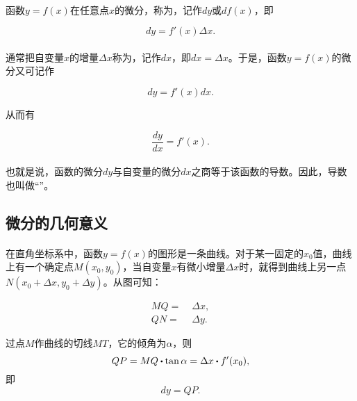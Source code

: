 \paragraph{}
函数$y=f(x)$在任意点$x$的微分，称为，记作$dy$或$df(x)$，即

\begin{equation}
  dy = f'(x)\Delta x.
\end{equation}

\paragraph{}
通常把自变量$x$的增量$\Delta x$称为，记作$dx$，即$dx = \Delta x$。于是，函数$y=f(x)$的微分又可记作

\begin{equation}
  dy = f'(x)dx.
\end{equation}

从而有

\begin{equation}
  \frac{dy}{dx} = f'(x).
\end{equation}

\paragraph{}
也就是说，函数的微分$dy$与自变量的微分$dx$之商等于该函数的导数。因此，导数也叫做“”。

\subsection{微分的几何意义}
\paragraph{}
在直角坐标系中，函数$y = f(x)$的图形是一条曲线。对于某一固定的$x_0$值，曲线上有一个确定点$M(x_0,y_0)$，当自变量$x$有微小增量$\Delta x$时，就得到曲线上另一点$N(x_0 + \Delta x, y_0 + \Delta y)$。从图可知：

\begin{align*}
  MQ =&\; \Delta x, \\
  QN =&\; \Delta y.
\end{align*}

过点$M$作曲线的切线$MT$，它的倾角为$\alpha$，则
\begin{equation*}
  QP = MQ \bigcdot \tan{\alpha} = \Delta x \bigcdot f'(x_0),
\end{equation*}
即
\begin{equation*}
  dy = QP.
\end{equation*}

